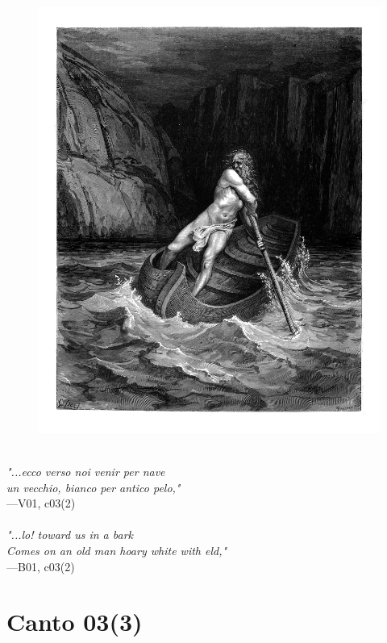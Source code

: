 \documentclass[../Dore_vision.tex]{subfiles}
\begin{document}
\begin{figure}[ht]
\centering
\includegraphics[height=\figsize]{illustrations/book_1/V01, c03(2).jpg}
\end{figure}

\begin{center}
\begin{minipage}{0.8\linewidth}
\textit{\\
"...ecco verso noi venir per nave\\un vecchio, bianco per antico pelo,"} \\
—V01, c03(2) \\~\\
\textit{"...lo! toward us in a bark\\Comes on an old man hoary white with eld,"} \\
—B01, c03(2)
\end{minipage}
\end{center}

\newpage

\section{Canto 03(3)}
\end{document}
